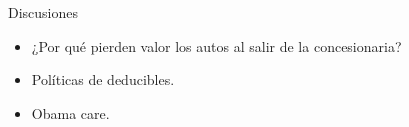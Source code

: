 \documentclass{beamer}
\begin{document}
\begin{frame}{Discusiones}
    \begin{itemize}
        \item ¿Por qué pierden valor los autos al salir de la concesionaria?
        \item Políticas de deducibles.
        \item Obama care.
    \end{itemize}
\end{frame}
\end{document}
